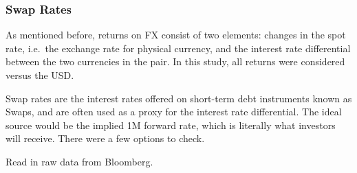 \documentclass[]{article}
\newenvironment{Shaded}{\begin{snugshade}}{\end{snugshade}}
\newcommand{\KeywordTok}[1]{\textcolor[rgb]{0.13,0.29,0.53}{\textbf{#1}}}
\newcommand{\DataTypeTok}[1]{\textcolor[rgb]{0.13,0.29,0.53}{#1}}
\newcommand{\DecValTok}[1]{\textcolor[rgb]{0.00,0.00,0.81}{#1}}
\newcommand{\StringTok}[1]{\textcolor[rgb]{0.31,0.60,0.02}{#1}}
\newcommand{\CommentTok}[1]{\textcolor[rgb]{0.56,0.35,0.01}{\textit{#1}}}
\newcommand{\OperatorTok}[1]{\textcolor[rgb]{0.81,0.36,0.00}{\textbf{#1}}}
\newcommand{\NormalTok}[1]{#1}
\begin{document}
\subsubsection{Swap Rates}\label{swap-rates}

As mentioned before, returns on FX consist of two elements: changes in
the spot rate, i.e.~the exchange rate for physical currency, and the
interest rate differential between the two currencies in the pair. In
this study, all returns were considered versus the USD.

Swap rates are the interest rates offered on short-term debt instruments
known as Swaps, and are often used as a proxy for the interest rate
differential. The ideal source would be the implied 1M forward rate,
which is literally what investors will receive. There were a few options
to check.

Read in raw data from Bloomberg.

\begin{Shaded}
\end{Shaded}
\end{document}
